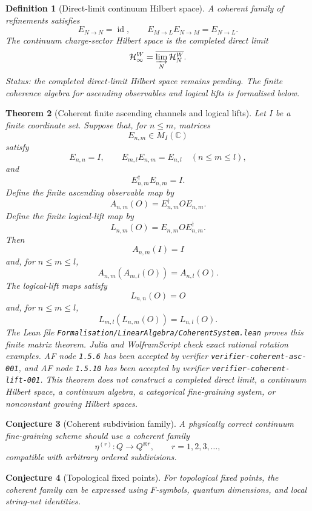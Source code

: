 \documentclass[11pt]{article}
\newtheorem{definition}{Definition}[section]
\newtheorem{theorem}[definition]{Theorem}
\newtheorem{conjecture}[definition]{Conjecture}
\begin{document}
\begin{definition}[Direct-limit continuum Hilbert space]
A coherent family of refinements satisfies
\[
E_{N\to N}=\operatorname{id},\qquad
E_{M\to L}E_{N\to M}=E_{N\to L}.
\]
The continuum charge-sector Hilbert space is the completed direct limit
\[
\mathcal H_\infty^W=\overline{\varinjlim_N\mathcal H_N^W}.
\]
Status: the completed direct-limit Hilbert space remains pending. The finite
coherence algebra for ascending observables and logical lifts is formalised
below.
\end{definition}

\begin{theorem}[Coherent finite ascending channels and logical lifts]
Let \(I\) be a finite coordinate set. Suppose that, for \(n\leq m\), matrices
\[
E_{n,m}\in M_I(\mathbb C)
\]
satisfy
\[
E_{n,n}=I,\qquad E_{m,l}E_{n,m}=E_{n,l}\quad(n\leq m\leq l),
\]
and
\[
E_{n,m}^\dagger E_{n,m}=I.
\]
Define the finite ascending observable map by
\[
A_{n,m}(O)=E_{n,m}^\dagger O E_{n,m}.
\]
Define the finite logical-lift map by
\[
L_{n,m}(O)=E_{n,m} O E_{n,m}^\dagger.
\]
Then
\[
A_{n,m}(I)=I
\]
and, for \(n\leq m\leq l\),
\[
A_{n,m}(A_{m,l}(O))=A_{n,l}(O).
\]
The logical-lift maps satisfy
\[
L_{n,n}(O)=O
\]
and, for \(n\leq m\leq l\),
\[
L_{m,l}(L_{n,m}(O))=L_{n,l}(O).
\]
The Lean file \texttt{Formalisation/LinearAlgebra/CoherentSystem.lean}
proves this finite matrix theorem. Julia and WolframScript check exact
rational rotation examples. AF node \texttt{1.5.6} has been accepted by
verifier \texttt{verifier-coherent-asc-001}, and AF node \texttt{1.5.10} has
been accepted by verifier \texttt{verifier-coherent-lift-001}. This theorem
does not construct a completed direct limit, a continuum Hilbert space, a
continuum algebra, a categorical fine-graining system, or nonconstant growing
Hilbert spaces.
\end{theorem}

\begin{conjecture}[Coherent subdivision family]
A physically correct continuum fine-graining scheme should use a coherent
family
\[
\eta^{(r)}:Q\to Q^{\otimes r},\qquad r=1,2,3,\ldots,
\]
compatible with arbitrary ordered subdivisions.
\end{conjecture}

\begin{conjecture}[Topological fixed points]
For topological fixed points, the coherent family can be expressed using
\(F\)-symbols, quantum dimensions, and local string-net identities.
\end{conjecture}
\end{document}

